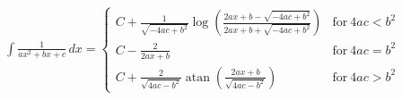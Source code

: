 \begin{align}
  \int \frac{1}{a x^{2} + b x + c}\, dx = \begin{cases} C + \frac{1}{\sqrt{- 4 a c + b^{2}}} \log{\left (\frac{2 a x + b - \sqrt{- 4 a c + b^{2}}}{2 a x + b + \sqrt{- 4 a c + b^{2}}} \right )} & \text{for}\: 4 a c < b^{2} \\C - \frac{2}{2 a x + b} & \text{for}\: 4 a c = b^{2} \\C + \frac{2}{\sqrt{4 a c - b^{2}}} \operatorname{atan}{\left (\frac{2 a x + b}{\sqrt{4 a c - b^{2}}} \right )} & \text{for}\: 4 a c > b^{2} \end{cases}
\end{align}
